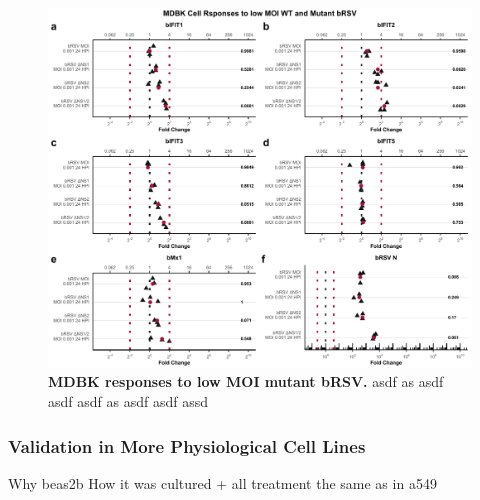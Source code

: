 \begin{figure}
    \centering
    \includegraphics[width=1\linewidth]{07. Chapter 2/Figs/02. Induction/06. mdbk_brsv_low_moi.pdf}
    \caption[MDBK responses to low MOI mutant bRSV.]{\textbf{MDBK responses to low MOI mutant bRSV.} asdf as asdf asdf asdf as asdf asdf assd }
    \label{MDBK responses to low MOI mutant bRSV}
\end{figure}



\subsubsection{Validation in More Physiological Cell Lines} \label{Validation in More Physiological Cell Lines}
Why beas2b \newline
How it was cultured + all treatment the same as in a549











